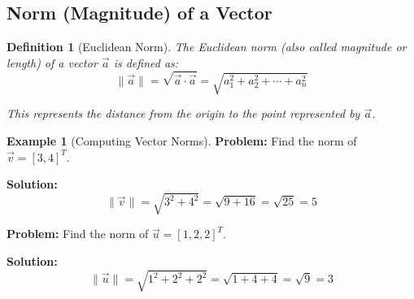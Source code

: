 \documentclass[12pt,a4paper]{article}
\theoremstyle{directpoint}
\newtheorem*{definition}{Definition}
\theoremstyle{definition}
\newtheorem{example}{Example}[section]
\begin{document}
\subsection{Norm (Magnitude) of a Vector}

\begin{definition}[Euclidean Norm]
The Euclidean norm (also called magnitude or length) of a vector $\vec{a}$ is defined as:
\begin{equation}
\|\vec{a}\| = \sqrt{\vec{a} \cdot \vec{a}} = \sqrt{a_1^2 + a_2^2 + \cdots + a_n^2}
\end{equation}

This represents the distance from the origin to the point represented by $\vec{a}$.
\end{definition}

\begin{center}
\end{center}

\begin{example}[Computing Vector Norms]
\textbf{Problem:} Find the norm of $\vec{v} = [3, 4]^T$.

\textbf{Solution:}
\begin{equation}
\|\vec{v}\| = \sqrt{3^2 + 4^2} = \sqrt{9 + 16} = \sqrt{25} = 5
\end{equation}

\textbf{Problem:} Find the norm of $\vec{u} = [1, 2, 2]^T$.

\textbf{Solution:}
\begin{equation}
\|\vec{u}\| = \sqrt{1^2 + 2^2 + 2^2} = \sqrt{1 + 4 + 4} = \sqrt{9} = 3
\end{equation}
\end{example}
\end{document}
